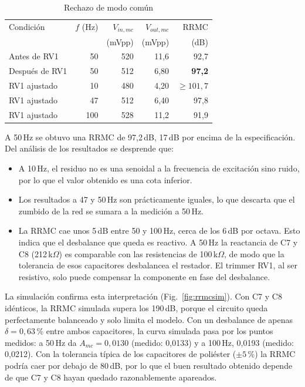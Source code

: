 \documentclass[journal,a4paper]{IEEEtran}
\begin{document}
\begin{table}[!t]
\centering
\caption{Rechazo de modo común}
\label{tab:rrmc}
\begin{tabular}{@{}lrrrr@{}}
\toprule
Condición & $f$ (Hz) & $V_{in,mc}$ & $V_{out,mc}$ & RRMC \\
 & & (mVpp) & (mVpp) & (dB) \\ \midrule
Antes de RV1 & 50 & 520 & 11,6 & 92,7 \\
Después de RV1 & 50 & 512 & 6,80 & \textbf{97,2} \\ \midrule
RV1 ajustado & 10 & 480 & 4,20 & $\geq 101{,}7$ \\
RV1 ajustado & 47 & 512 & 6,40 & 97,8 \\
RV1 ajustado & 100 & 528 & 11,2 & 91,9 \\ \bottomrule
\end{tabular}
\end{table}

A 50\,Hz se obtuvo una RRMC de 97,2\,dB, 17\,dB por encima de la especificación. Del análisis de los resultados se desprende que:
\begin{itemize}
\item A 10\,Hz, el residuo no es una senoidal a la frecuencia de excitación sino ruido, por lo que el valor obtenido es una cota inferior.
\item Los resultados a 47 y 50\,Hz son prácticamente iguales, lo que descarta que el zumbido de la red se sumara a la medición a 50\,Hz.
\item La RRMC cae unos 5\,dB entre 50 y 100\,Hz, cerca de los 6\,dB por octava. Esto indica que el desbalance que queda es reactivo. A 50\,Hz la reactancia de C7 y C8 (212\,k$\Omega$) es comparable con las resistencias de 100\,k$\Omega$, de modo que la tolerancia de esos capacitores desbalancea el restador. El trimmer RV1, al ser resistivo, solo puede compensar la componente en fase del desbalance.
\end{itemize}

La simulación confirma esta interpretación (Fig.~\ref{fig:rrmcsim}). Con C7 y C8 idénticos, la RRMC simulada supera los 190\,dB, porque el circuito queda perfectamente balanceado y solo limita el modelo. Con un desbalance de apenas $\delta = 0{,}63$\,\% entre ambos capacitores, la curva simulada pasa por los puntos medidos: a 50\,Hz da $A_{mc} = 0{,}0130$ (medido: 0,0133) y a 100\,Hz, 0,0193 (medido: 0,0212). Con la tolerancia típica de los capacitores de poliéster ($\pm 5$\,\%) la RRMC podría caer por debajo de 80\,dB, por lo que el buen resultado obtenido depende de que C7 y C8 hayan quedado razonablemente apareados.
\end{document}
